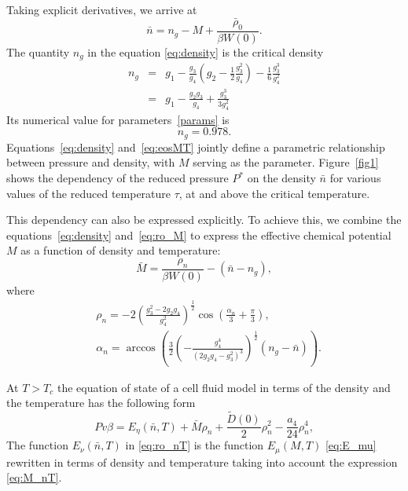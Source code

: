\documentclass[12pt]{article}
\begin{document}
	Taking explicit derivatives, we arrive at
	\begin{equation}\label{eq:density}
	\bar n = n_g - M + \frac{ \bar \rho_0}{\beta W(0)}.
	\end{equation}
	The quantity $n_g$ in the equation \eqref{eq:density} is the critical density
	\begin{eqnarray}\label{eq:crit_dens}
	n_g & = & g_1 - \frac{g_3}{g_4}\left(  g_2 - \frac{1}{2} \frac{g_3^2}{g_4}\right) - \frac{1}{6} \frac{g_3^3}{g_4^2} 
	\nonumber\\
	& = & g_1 - \frac{g_2 g_3}{g_4} + \frac{g_3^3}{3g_4^2}
	\end{eqnarray}
	Its numerical value for parameters~\eqref{params} is
	\begin{equation*}
		n_g = 0.978.
	\end{equation*}
	Equations~\eqref{eq:density} and~\eqref{eq:eosMT} jointly define a parametric relationship between pressure and density, with $M$ serving as the parameter. Figure~\ref{fig1} shows the dependency of the reduced pressure $P^*$ on the density $\bar{n}$ for various values of the reduced temperature $\tau$, at and above the critical temperature.
	
	This dependency can also be expressed explicitly. To achieve this, we combine the equations~\eqref{eq:density} and~\eqref{eq:ro_M} to express the effective chemical potential $M$ as a function of density and temperature:
	\begin{equation}\label{eq:M_nT}
		\bar M = \frac{\rho_{n}}{\beta W(0)} - (\bar n - n_g),
	\end{equation}
	where
	\begin{align} \label{eq:ro_nT}
		 & \rho_{n} = - 2 \left(\frac{g_3^2 - 2g_2 g_4}{g_4^2} \right)^{\frac{1}{2}} \cos \left( \frac{\alpha_n}{3} + \frac{\pi}{3} \right), \\
		 & \alpha_n = \arccos \left( \frac{3}{2} \left( - \frac{g_4^4}{\left( 2 g_2 g_4 - g_3^2\right)^3}\right)^{\frac{1}{2}} (n_g - \bar n)\right). \nonumber
	\end{align}
	
	
	At $T>T_c$ the equation of state of a cell fluid model in terms of the density and the temperature has the following form
	\begin{equation}\label{eq:eosNT}
	Pv\beta = E_\eta (\bar n,T) + \bar M \rho_{n} + \frac{\tilde D(0)}{2} \rho_{n}^2 - \frac{a_4}{24} \rho_{n}^4,
	\end{equation}
 The function $E_\nu (\bar n, T)$ in \eqref{eq:ro_nT} is the function $E_\mu (M,T)$ \eqref{eq:E_mu} rewritten in terms of density and temperature taking into account the expression \eqref{eq:M_nT}.
	
\end{document}
